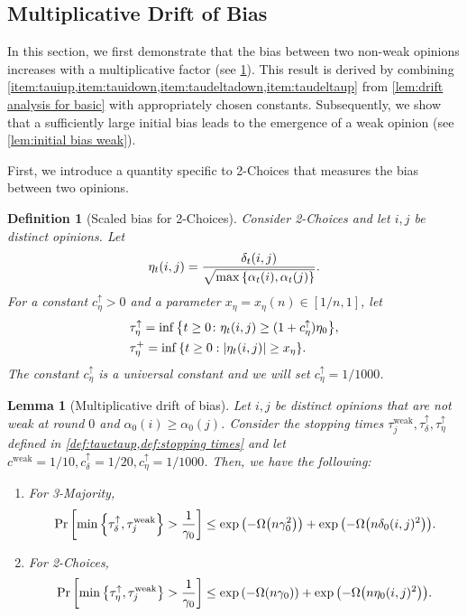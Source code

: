 \documentclass[letterpaper,11pt]{article}
\newtheorem{lemma}[theorem]{Lemma}
\newtheorem{definition}[theorem]{Definition}
\newcommand{\alphanorm}{\gamma}
\newcommand{\tauetaplus}{\tau^{+}_\eta}
\newcommand{\cweak}{c^{\mathrm{weak}}}
\newcommand{\taudeltaup}{\tau^{\uparrow}_\delta}
\newcommand{\cdeltaup}{c^{\uparrow}_\delta}
\newcommand{\taujweak}{\tau^{\mathrm{weak}}_j}
\newcommand{\deltaratio}{\eta}
\newcommand{\tauetaup}{\tau^{\uparrow}_\eta}
\newcommand{\cetaup}{c^\uparrow_\eta}
\newcommand{\xeta}{x_{\eta}}
\begin{document}
\subsection{Multiplicative Drift of Bias}\label{sec:multiplicative drift of bias}
In this section, we first demonstrate that the bias between two non-weak opinions increases with a multiplicative factor (see \cref{lem:deltaupweak}). 
This result is derived by combining \cref{item:tauiup,item:tauidown,item:taudeltadown,item:taudeltaup} from \cref{lem:drift analysis for basic} with appropriately chosen constants. 
Subsequently, we show that a sufficiently large initial bias leads to the emergence of a weak opinion (see \cref{lem:initial bias weak}).

First, we introduce a quantity specific to 2-Choices that measures the bias between two opinions.
\begin{definition}[Scaled bias for 2-Choices] \label{def:tauetaup}
  Consider 2-Choices and let $ i,j $ be distinct opinions.
  Let
  \begin{align*} 
    \deltaratio_t(i,j) = \frac{\delta_t(i,j)}{\sqrt{\max\qty{\alpha_t(i),\alpha_t(j)}}}.
  \end{align*}
  For a constant $\cetaup>0$ and a parameter $ \xeta=\xeta(n)\in[1/n,1] $, let
  \begin{align*} 
    &\tauetaup = \inf\qty{ t\ge 0 \colon \deltaratio_t(i,j) \ge (1+\cetaup)\deltaratio_0 }, \\
    &\tauetaplus = \inf\qty{t\geq 0: \abs{\eta_t(i,j)}\geq \xeta}.
  \end{align*}  
  The constant $\cetaup$ is a universal constant and we will set $\cetaup=1/1000$.
\end{definition}
\begin{lemma}[Multiplicative drift of bias]\label{lem:deltaupweak}
  Let $ i,j $ be distinct opinions that are not weak at round $ 0 $ and $ \alpha_0(i) \ge \alpha_0(j) $.
  Consider the stopping times $\taujweak,\taudeltaup, \tauetaup$ defined in \cref{def:tauetaup,def:stopping times}
  and let $\cweak=1/10, \cdeltaup=1/20, \cetaup=1/1000$.
  Then, we have the following:
\begin{enumerate}
  \renewcommand{\labelenumi}{(\roman{enumi})}
  \item For 3-Majority,
  \begin{align*} 
     \Pr\qty[ \min\qty{ \taudeltaup,\taujweak } >  \frac{1}{\alphanorm_0} ] \le \exp\qty(-\Omega\qty(n\alphanorm_0^2)) + \exp\qty(-\Omega\qty(n\delta_0(i,j)^2)). %
  \end{align*}
  \item For 2-Choices,
  \begin{align*} 
    \Pr\qty[ \min\qty{ \tauetaup,\taujweak } >  \frac{1}{\alphanorm_0} ] \le  \exp\qty(-\Omega\qty(n\alphanorm_0)) + \exp\qty(-\Omega\qty( n\eta_0(i,j)^2 )).
  \end{align*}
\end{enumerate}
\end{lemma}
\end{document}
